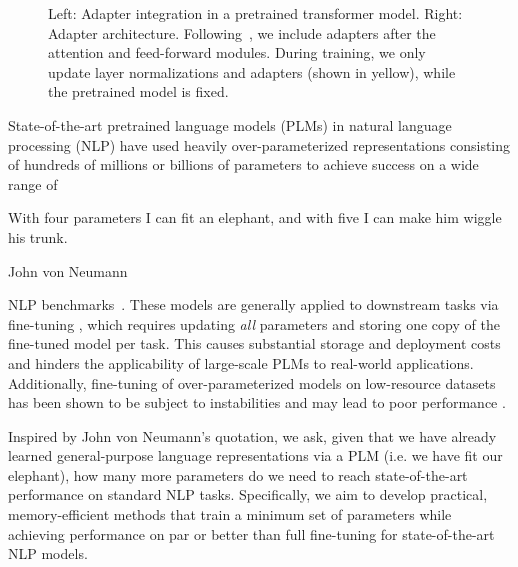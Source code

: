 \documentclass{article}
\begin{document}
\begin{figure}[tp]
\begin{minipage}[b]{0.36\linewidth}
\vspace{-0.5em}
\caption{
Left: Adapter integration in a pretrained transformer model.  Right: Adapter architecture. Following~\citet{houlsby2019parameter}, we include adapters after the attention  and feed-forward modules. During training, we only update layer normalizations and adapters (shown in yellow), while the pretrained model is fixed.}\vspace{-0.7em} 
\label{fig:our_method} 
\end{minipage}
\end{figure}

\parbox[b]{0.5\textwidth}{
State-of-the-art pretrained language models (PLMs) in natural language processing (NLP) have used heavily over-parameterized representations consisting of hundreds of millions or billions of parameters to achieve success on a wide range of 
  \linebreak ~ \vspace{-\baselineskip}
}
\parbox[b]{0.45\textwidth}{
  \epigraph{With four parameters I can fit an elephant, and with five I can make him wiggle his trunk.}{John von Neumann}
}
NLP benchmarks~\citep{devlin2019bert, raffel2019exploring, liu2019roberta}. These models are generally applied to downstream tasks via fine-tuning \citep{howard-2018-ulmfit}, which requires updating \emph{all} parameters and storing one copy of the fine-tuned model per task.
This causes substantial storage and deployment costs and hinders the applicability of large-scale PLMs to real-world applications. Additionally, fine-tuning of over-parameterized models on low-resource datasets has been shown to be subject to instabilities and may lead to poor performance \citep{peters-2019-tune,Dodge2020fine-tuning}.

Inspired by John von Neumann's quotation, we ask, given that we have already learned general-purpose language representations via a PLM (i.e. we have fit our elephant), how many more parameters do we need to reach state-of-the-art performance on standard NLP tasks. Specifically, we aim to develop practical, memory-efficient methods that train a minimum set of parameters while achieving performance on par or better than full fine-tuning for state-of-the-art NLP models.
\end{document}
